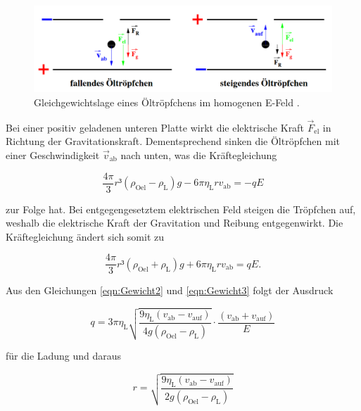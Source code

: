 \begin{figure}
    \centering
    \includegraphics[width=\textwidth]{GewichtV.png}
    \caption{Gleichgewichtslage eines Öltröpfchens im homogenen E-Feld \cite{Versuchsanleitung_v503}.}
    \label{fig:GewichtV}
\end{figure}

\noindent Bei einer positiv geladenen unteren Platte wirkt die elektrische Kraft $\vec{F}_\text{el}$
in Richtung der Gravitationskraft. Dementsprechend sinken die Öltröpfchen mit einer Geschwindigkeit $\vec{v}_\text{ab}$
nach unten, was die Kräftegleichung 

\begin{equation}
\label{eqn:Gewicht2}
    \frac{4\pi}{3}r³\left(\rho_\text{Oel}-\rho_\text{L}\right)g - 6\pi{}\eta_\text{L}rv_\text{ab} = -qE
\end{equation}

\noindent zur Folge hat. Bei entgegengesetztem elektrischen Feld steigen die Tröpfchen auf, weshalb die
elektrische Kraft der Gravitation und Reibung entgegenwirkt. Die Kräftegleichung ändert sich somit zu 

\begin{equation}
\label{eqn:Gewicht3}
\frac{4\pi}{3}r³\left(\rho_\text{Oel}+\rho_\text{L}\right)g + 6\pi{}\eta_\text{L}rv_\text{ab} = qE.
\end{equation}

\noindent Aus den Gleichungen \eqref{eqn:Gewicht2} und \eqref{eqn:Gewicht3} folgt der Ausdruck

\begin{equation}
\label{eqn:Ladung}
    q = 3\pi{}\eta_\text{L}\sqrt{\frac{9\eta_\text{L}\left(v_\text{ab}-v_\text{auf}\right)}{4g\left(\rho_\text{Oel}-\rho_\text{L}\right)}}\cdot\frac{\left(v_\text{ab}+v_\text{auf}\right)}{E}
\end{equation}

\noindent für die Ladung und daraus

\begin{equation}
\label{eqn:Radius}
    r = \sqrt{\frac{9\eta_\text{L}\left(v_\text{ab}-v_\text{auf}\right)}{2g\left(\rho_\text{Oel}-\rho_\text{L}\right)}}
\end{equation}

